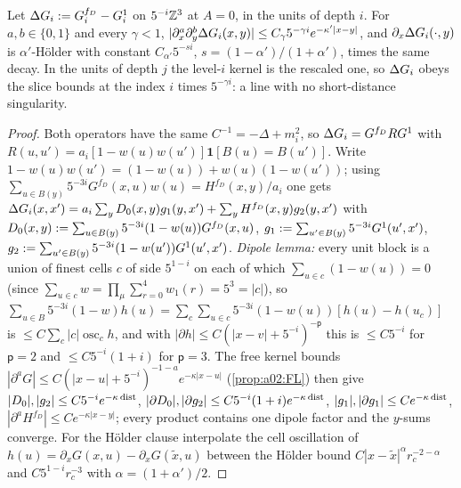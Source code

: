 \begin{lemma}\label{lem:a02:RSB}
Let $\Delta G_i:= G^{f_D}_i-G^1_i$ on $5^{-i}\mathbb Z^3$ at $A=0$, in the units of depth $i$. For $a,b\in\{0,1\}$ and every $\gamma<1$, $|\partial^a_x\partial^b_y\Delta G_i(x,y)|\le C_\gamma5^{-\gamma i}e^{-\kappa'|x-y|}$, and $\partial_x\Delta G_i(\cdot,y)$ is $\alpha'$-H\"older with constant $C_{\alpha'}5^{-s i}$, $s=(1-\alpha')/(1+\alpha')$, times the same decay. In the units of depth $j$ the level-$i$ kernel is the rescaled one, so $\Delta G_i$ obeys the slice bounds \cite[(3.63)--(3.65)]{K1} at the index $i$ times $5^{-\gamma i}$: a line with no short-distance singularity.
\end{lemma}
\begin{proof}
Both operators have the same $C^{-1}=-\Delta+m_i^2$, so $\Delta G_i=G^{f_D}RG^1$ with $R(u,u')=a_i[1-w(u)w(u')]\mathbf 1[B(u)=B(u')]$. Write $1-w(u)w(u')=(1-w(u))+w(u)(1-w(u'))$; using $\sum_{u\in B(y)}5^{-3i}G^{f_D}(x,u)w(u)=H^{f_D}(x,y)/a_i$ one gets $\Delta G_i(x,x')=a_i\sum_yD_0(x,y)g_1(y,x')+\sum_yH^{f_D}(x,y)g_2(y,x')$ with $D_0(x,y):=\sum_{u\in B(y)}5^{-3i}(1-w(u))G^{f_D}(x,u)$, $g_1:=\sum_{u'\in B(y)}5^{-3i}G^1(u',x')$, $g_2:=\sum_{u'\in B(y)}5^{-3i}(1-w(u'))G^1(u',x')$. \emph{Dipole lemma:} every unit block is a union of finest cells $c$ of side $5^{1-i}$ on each of which $\sum_{u\in c}(1-w(u))=0$ (since $\sum_{u\in c}w=\prod_\mu\sum_{r=0}^4w_1(r)=5^3=|c|$), so $\sum_{u\in B}5^{-3i}(1-w)h(u)=\sum_c\sum_{u\in c}5^{-3i}(1-w(u))[h(u)-h(u_c)]$ is $\le C\sum_c|c|\operatorname{osc}_ch$, and with $|\partial h|\le C(|x-v|+5^{-i})^{-\mathsf p}$ this is $\le C5^{-i}$ for $\mathsf p=2$ and $\le C5^{-i}(1+i)$ for $\mathsf p=3$. The free kernel bounds $|\partial^aG|\le C(|x-u|+5^{-i})^{-1-a}e^{-\kappa|x-u|}$ (\cref{prop:a02:FL}) then give $|D_0|,|g_2|\le C5^{-i}e^{-\kappa\operatorname{dist}}$, $|\partial D_0|,|\partial g_2|\le C5^{-i}(1+i)e^{-\kappa\operatorname{dist}}$, $|g_1|,|\partial g_1|\le Ce^{-\kappa\operatorname{dist}}$, $|\partial^aH^{f_D}|\le Ce^{-\kappa|x-y|}$; every product contains one dipole factor and the $y$-sums converge. For the H\"older clause interpolate the cell oscillation of $h(u)=\partial_xG(x,u)-\partial_xG(\tilde x,u)$ between the H\"older bound $C|x-\tilde x|^{\alpha}r_c^{-2-\alpha}$ and $C5^{1-i}r_c^{-3}$ with $\alpha=(1+\alpha')/2$.
\end{proof}

